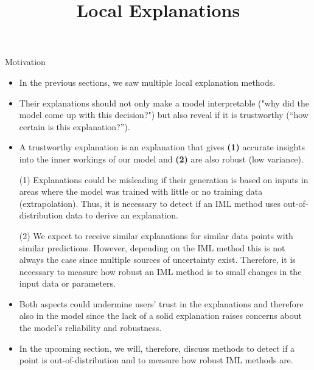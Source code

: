 \documentclass[11pt,compress,t,notes=noshow, aspectratio=169, xcolor=table]{beamer}
\title{Local Explanations}
\begin{document}
	



\newcommand{\titlefigure}{figure/dbscan.jpg}
\newcommand{\learninggoals}{
\item Understand the aspects that undermine users' trust in an explanation
\item Learn diagnostic tools that could increase trust }





\begin{vbframe}{Motivation}
	\begin{itemize}
		\item In the previous sections, we saw multiple local explanation methods. 
		\item Their explanations should not only make a model interpretable ("why did the model come up with this decision?") but also reveal if it is trustworthy (``how certain is this explanation?'').
		\item A trustworthy explanation is an explanation that gives \textbf{(1)} accurate insights into the inner workings of our model and \textbf{(2)} are also robust (low variance). 
		\item[(1)] Explanations could be misleading if their generation is based on inputs in areas where the model was trained with little or no training data (extrapolation). Thus, it is necessary to detect if an IML method uses out-of-distribution data to derive an explanation. 
		\item[(2)] We expect to receive similar explanations for similar data points with similar predictions. However, depending on the IML method this is not always the case since multiple sources of uncertainty exist. Therefore, it is necessary to measure how robust an IML method is to small changes in the input data or parameters. 
		\item Both aspects could undermine users' trust in the explanations and therefore also in the model since the lack of a solid explanation raises concerns about the model's reliability and robustness. 
		\item In the upcoming section, we will, therefore, discuss methods to detect if a point is out-of-distribution and to measure how robust IML methods are.
	\end{itemize}
\end{vbframe}
\end{document}

